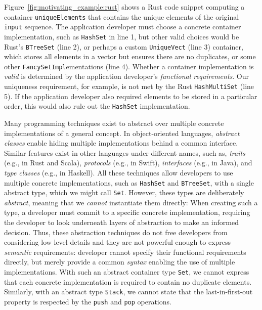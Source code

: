 Figure~\ref{fig:motivating_example:rust} shows a Rust code snippet computing a container \lstinline{uniqueElements} that contains the unique elements of the original \lstinline{input} sequence.
The application developer must choose a concrete container implementation, such as \lstinline{HashSet} in line 1, but
other valid choices would be Rust's \lstinline{BTreeSet} (line 2), or perhaps a custom \lstinline{UniqueVect} (line 3) container, which stores all elements in a vector but ensures there are no duplicates, 
or some other \lstinline{FancySetImpl}ementations (line 4). 
Whether a container implementation is \emph{valid} is determined by the application developer's \emph{functional requirements}. Our uniqueness requirement, for example, is not met by the Rust \lstinline{HashMultiSet} (line 5). 
If the application developer also required elements to be stored in a particular order, this would also rule out the \lstinline|HashSet| implementation.

Many programming techniques exist to abstract over multiple concrete implementations of a general concept.
In object-oriented languages, \emph{abstract classes} enable hiding multiple implementations behind a common interface.
Similar features exist in other languages under different names, such as, \emph{traits} (e.g., in Rust and Scala), \emph{protocols} (e.g., in Swift), \emph{interfaces} (e.g., in Java), and \emph{type classes} (e.g., in Haskell).
All these techniques allow developers to use multiple concrete implementations, such as \lstinline{HashSet} and \lstinline{BTreeSet}, with a single abstract type, which we might call \lstinline{Set}.
However, these types are deliberately \emph{abstract}, meaning that we \emph{cannot} instantiate them directly:
When creating such a type, a developer must commit to a specific concrete implementation, requiring the developer to look underneath layers of abstraction to make an informed decision.
Thus, these abstraction techniques do not free developers from considering low level details and they are not powerful enough to express \emph{semantic} requirements:
developer cannot specify their functional requirements directly, but merely provide a common \emph{syntax} enabling the use of multiple implementations. 
With such an abstract container type \lstinline{Set}, we cannot express that each concrete implementation is required to contain no duplicate elements.
Similarly, with an abstract type \lstinline{Stack}, we cannot state that the last-in-first-out property is respected by the \lstinline{push} and \lstinline{pop} operations.

